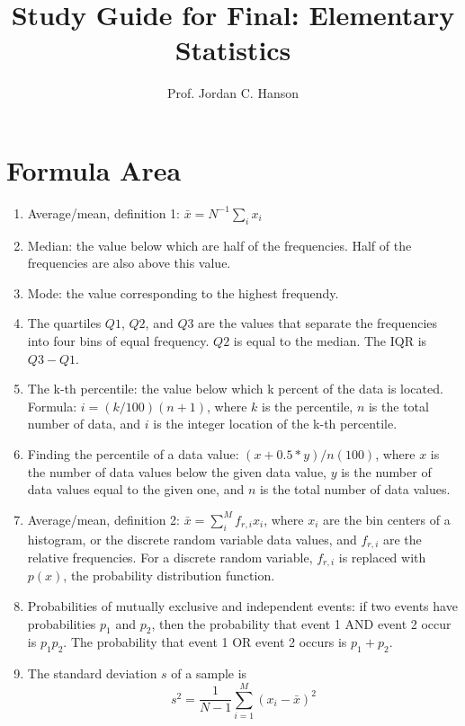 \documentclass{article}
\begin{document}
\title{Study Guide for Final: Elementary Statistics}
\author{Prof. Jordan C. Hanson}

\maketitle

\section{Formula Area}

\begin{enumerate}
\item Average/mean, definition 1: $\bar{x} = N^{-1} \sum_i x_i$
\item Median: the value below which are half of the frequencies.  Half of the frequencies are also above this value.
\item Mode: the value corresponding to the highest frequendy.
\item The quartiles $Q1$, $Q2$, and $Q3$ are the values that separate the frequencies into four bins of equal frequency. $Q2$ is equal to the median.  The IQR is $Q3 - Q1$.
\item The k-th percentile: the value below which k percent of the data is located.  Formula: $i = (k/100) (n+1)$, where $k$ is the percentile, $n$ is the total number of data, and $i$ is the integer location of the k-th percentile.
\item Finding the percentile of a data value: $(x+0.5*y)/n (100)$, where $x$ is the number of data values below the given data value, $y$ is the number of data values equal to the given one, and $n$ is the total number of data values.
\item Average/mean, definition 2: $\bar{x} = \sum_i^{M} f_{r,i} x_i$, where $x_i$ are the bin centers of a histogram, or the discrete random variable data values, and $f_{r,i}$ are the relative frequencies.  For a discrete random variable, $f_{r,i}$ is replaced with $p(x)$, the probability distribution function.
\item Probabilities of mutually exclusive and independent events: if two events have probabilities $p_1$ and $p_2$, then the probability that event 1 AND event 2 occur is $p_1 p_2$.  The probability that event 1 OR event 2 occurs is $p_1 + p_2$.
\item The standard deviation $s$ of a sample is 
\begin{equation}
s^2 = \frac{1}{N-1}\sum_{i=1}^{M} (x_i-\bar{x})^2
\end{equation}

\end{enumerate}
\end{document}
